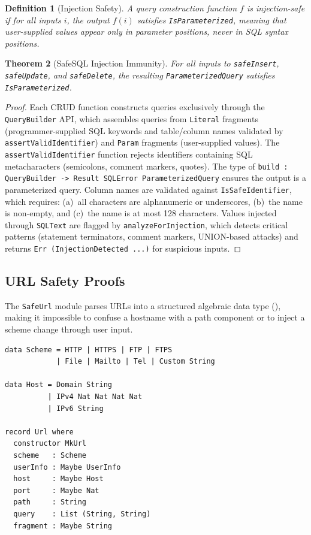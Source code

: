 \documentclass[11pt,a4paper]{article}
\newtheorem{theorem}{Theorem}[section]
\newtheorem{definition}[theorem]{Definition}
\newcommand{\safe}[1]{\texttt{Safe#1}}
\newcommand{\code}[1]{\texttt{#1}}
\begin{document}
\begin{definition}[Injection Safety]
A query construction function $f$ is \emph{injection-safe} if for all
inputs $i$, the output $f(i)$ satisfies \code{IsParameterized}, meaning
that user-supplied values appear only in parameter positions, never in
SQL syntax positions.
\end{definition}

\begin{theorem}[SafeSQL Injection Immunity]
For all inputs to \code{safeInsert}, \code{safeUpdate}, and
\code{safeDelete}, the resulting \code{ParameterizedQuery} satisfies
\code{IsParameterized}.
\end{theorem}

\begin{proof}
Each CRUD function constructs queries exclusively through the
\code{QueryBuilder} API, which assembles queries from \code{Literal}
fragments (programmer-supplied SQL keywords and table/column names
validated by \code{assertValidIdentifier}) and \code{Param} fragments
(user-supplied values). The \code{assertValidIdentifier} function rejects
identifiers containing SQL metacharacters (semicolons, comment markers,
quotes). The type of \code{build : QueryBuilder -> Result SQLError
ParameterizedQuery} ensures the output is a parameterized query.
Column names are validated against \code{IsSafeIdentifier}, which
requires: (a)~all characters are alphanumeric or underscores,
(b)~the name is non-empty, and (c)~the name is at most 128 characters.
Values injected through \code{SQLText} are flagged by
\code{analyzeForInjection}, which detects critical patterns (statement
terminators, comment markers, UNION-based attacks) and returns
\code{Err (InjectionDetected ...)} for suspicious inputs.
\end{proof}

\subsection{URL Safety Proofs}
\label{sec:proof-url}

The \safe{Url} module parses URLs into a structured algebraic data type
(), making it impossible to confuse a hostname with
a path component or to inject a scheme change through user input.

\begin{lstlisting}[language=Idris2, caption={URL type definitions from
\code{Proven.SafeUrl}. The algebraic structure makes component confusion
structurally impossible.}, label=lst:url-types]
data Scheme = HTTP | HTTPS | FTP | FTPS
            | File | Mailto | Tel | Custom String

data Host = Domain String
          | IPv4 Nat Nat Nat Nat
          | IPv6 String

record Url where
  constructor MkUrl
  scheme   : Scheme
  userInfo : Maybe UserInfo
  host     : Maybe Host
  port     : Maybe Nat
  path     : String
  query    : List (String, String)
  fragment : Maybe String
\end{lstlisting}
\end{document}
